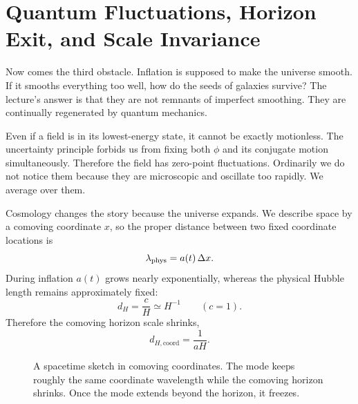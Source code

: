 \section{Quantum Fluctuations, Horizon Exit, and Scale Invariance}

Now comes the third obstacle. Inflation is supposed to make the universe smooth. If it smooths everything too well, how do the seeds of galaxies survive? The lecture's answer is that they are not remnants of imperfect smoothing. They are continually regenerated by quantum mechanics.

Even if a field is in its lowest-energy state, it cannot be exactly motionless. The uncertainty principle forbids us from fixing both \(\phi\) and its conjugate motion simultaneously. Therefore the field has zero-point fluctuations. Ordinarily we do not notice them because they are microscopic and oscillate too rapidly. We average over them.

Cosmology changes the story because the universe expands. We describe space by a comoving coordinate \(x\), so the proper distance between two fixed coordinate locations is
\begin{equation}
\lambda_{\rm phys}=a(t)\,\Delta x.
\end{equation}
During inflation \(a(t)\) grows nearly exponentially, whereas the physical Hubble length remains approximately fixed:
\begin{equation}
d_H=\frac{c}{H}\simeq H^{-1}
\qquad (c=1).
\end{equation}
Therefore the comoving horizon scale shrinks,
\begin{equation}
d_{H,\mathrm{coord}}=\frac{1}{aH}.
\end{equation}

\begin{figure}[t]
\centering
{}
\caption{A spacetime sketch in comoving coordinates. The mode keeps roughly the same coordinate wavelength while the comoving horizon shrinks. Once the mode extends beyond the horizon, it freezes.}
\end{figure}

